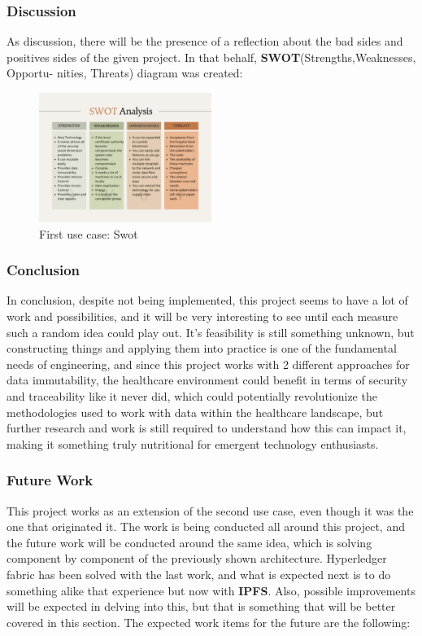 \subsubsection{Discussion}
As discussion, there will be the presence of a  reflection about the bad sides and positives sides of the given project. In that behalf, \textbf{SWOT}(Strengths,Weaknesses, Opportu-
nities, Threats) diagram was created:

\begin{figure}[H]
    \centering
    \includegraphics[width=0.5\textwidth]{assets/use-case-1/swot.png} %
    \caption{First use case: Swot}
    \label{fig:sample-image} 
\end{figure}

\subsubsection{Conclusion} 
In conclusion, despite not being implemented, this project seems to have a lot of work and possibilities, and it will be very interesting to see until each measure such a random idea could play out. It's feasibility is still something unknown, but constructing things and applying them into practice is one of the fundamental needs of engineering, and since this project works with 2 different approaches for data immutability, the healthcare environment could benefit in terms of security and traceability like it never did, which could potentially revolutionize the methodologies used to work with data within the healthcare landscape, but further research and work is still required to understand how this can impact it, making it something truly nutritional for emergent technology enthusiasts.

\subsubsection{Future Work}
This project works as an extension of the second use case, even though it was the one that originated it. The work is being conducted all around this project, and the future work will be conducted around the same idea, which is solving component by component of the previously shown architecture. Hyperledger fabric has been solved with the last work, and what is expected next is to do something alike that experience but now with \textbf{IPFS}. Also, possible improvements will be expected in delving into this, but that is something that will be better covered in this section. The expected work items for the future are the following:

